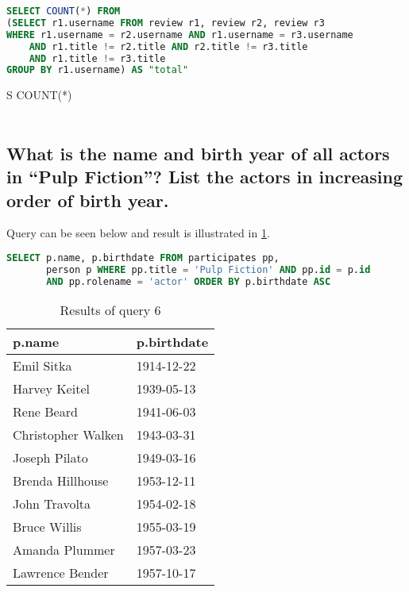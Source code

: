 \begin{lstlisting}[language=SQL]
SELECT COUNT(*) FROM 
(SELECT r1.username FROM review r1, review r2, review r3
WHERE r1.username = r2.username AND r1.username = r3.username
    AND r1.title != r2.title AND r2.title != r3.title
    AND r1.title != r3.title
GROUP BY r1.username) AS "total"
\end{lstlisting}

\begin{table}
  \centering
  \begin{tabular}[htpb]{S}
    \toprule
    {COUNT(*)} \\
     \\
    \bottomrule
  \end{tabular}
  \caption{Results of query 5}\label{tab:5q5}
\end{table}

\subsection{What is the name and birth year of all actors in “Pulp Fiction”? List the actors in increasing order of birth year.}
Query can be seen below and result is illustrated in \cref{tab:5q6}.

\begin{lstlisting}[language=SQL]
SELECT p.name, p.birthdate FROM participates pp,
       person p WHERE pp.title = 'Pulp Fiction' AND pp.id = p.id
       AND pp.rolename = 'actor' ORDER BY p.birthdate ASC
\end{lstlisting}

\begin{table}
  \centering
  \begin{tabular}[htpb]{l l}
    \toprule
    p.name & p.birthdate \\
    \midrule
    Emil Sitka & 1914-12-22 \\
    Harvey Keitel & 1939-05-13 \\
    Rene Beard & 1941-06-03 \\
    Christopher Walken & 1943-03-31 \\
    Joseph Pilato & 1949-03-16 \\
    Brenda Hillhouse & 1953-12-11 \\
    John Travolta & 1954-02-18 \\
    Bruce Willis & 1955-03-19 \\
    Amanda Plummer & 1957-03-23 \\
    Lawrence Bender & 1957-10-17 \\
    \bottomrule
  \end{tabular}
  \caption{Results of query 6}\label{tab:5q6}
\end{table}


